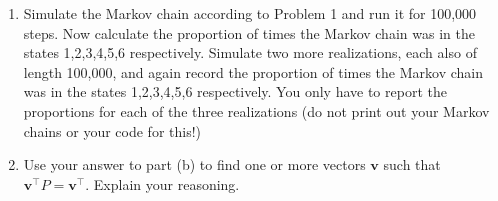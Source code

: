 \documentclass{article}
\begin{document}
\begin{enumerate}
\begin{enumerate}
    \item Simulate the Markov chain according to Problem 1 and run it for
    100,000 steps. Now calculate the proportion of times the Markov chain was in
    the states 1,2,3,4,5,6 respectively. Simulate two more realizations, each
    also of length 100,000, and again record the proportion of times the Markov
    chain was in the states 1,2,3,4,5,6 respectively. You only have to report
    the proportions for each of the three realizations (do not print out your
    Markov chains or your code for this!)

    \item Use your answer to part (b) to find one or more vectors $\bm v$ such
    that $\bm v^\top P=\bm v^\top$. Explain your reasoning.

    \end{enumerate}

\end{enumerate}
\end{document}
